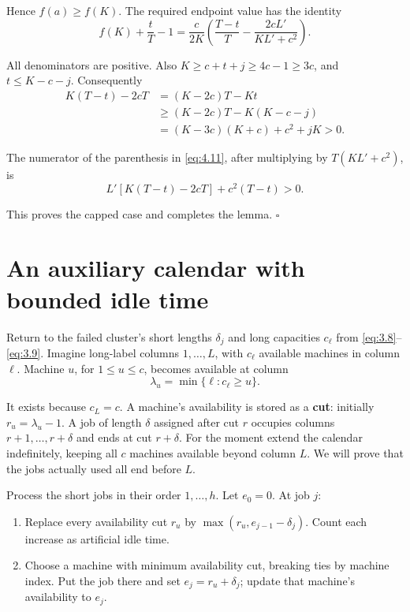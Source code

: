 \documentclass[11pt,a4paper]{article}
\providecommand{\tightlist}{\setlength{\itemsep}{0pt}\setlength{\parskip}{0pt}}
\begin{document}
Hence \(f(a)\ge f(K)\). The required endpoint value has the identity
\begin{equation}
f(K)+\frac tT-1
=\frac{c}{2K}
 \left(\frac{T-t}{T}-\frac{2cL'}{KL'+c^2}\right).
\tag{4.11}
\label{eq:4.11}
\end{equation}

All denominators are positive. Also \(K\ge c+t+j\ge4c-1\ge3c\), and \(t\le K-c-j\). Consequently
\begin{equation}
\begin{aligned}
K(T-t)-2cT
&=(K-2c)T-Kt\\
&\ge(K-2c)T-K(K-c-j)\\
&=(K-3c)(K+c)+c^2+jK>0.
\end{aligned}
\tag{4.12}
\label{eq:4.12}
\end{equation}

The numerator of the parenthesis in \eqref{eq:4.11}, after multiplying by \(T(KL'+c^2)\), is
\[
L'[K(T-t)-2cT]+c^2(T-t)>0.
\]

This proves the capped case and completes the lemma. \(\square\)

\hypertarget{an-auxiliary-calendar-with-bounded-idle-time}{%
\section{An auxiliary calendar with bounded idle time}\label{an-auxiliary-calendar-with-bounded-idle-time}}

Return to the failed cluster's short lengths \(\delta_j\) and long capacities \(c_\ell\) from \eqref{eq:3.8}--\eqref{eq:3.9}. Imagine long-label columns \(1,\ldots,L\), with \(c_\ell\) available machines in column \(\ell\). Machine \(u\), for \(1\le u\le c\), becomes available at column
\[
\lambda_u=\min\{\ell:c_\ell\ge u\}.
\]

It exists because \(c_L=c\). A machine's availability is stored as a \textbf{cut}: initially \(r_u=\lambda_u-1\). A job of length \(\delta\) assigned after cut \(r\) occupies columns \(r+1,\ldots,r+\delta\) and ends at cut \(r+\delta\). For the moment extend the calendar indefinitely, keeping all \(c\) machines available beyond column \(L\). We will prove that the jobs actually used all end before \(L\).

Process the short jobs in their order \(1,\ldots,h\). Let \(e_0=0\). At job \(j\):

\begin{enumerate}
\def\labelenumi{\arabic{enumi}.}
\tightlist
\item
  Replace every availability cut \(r_u\) by \(\max(r_u,e_{j-1}-\delta_j)\). Count each increase as artificial idle time.
\item
  Choose a machine with minimum availability cut, breaking ties by machine index. Put the job there and set \(e_j=r_u+\delta_j\); update that machine's availability to \(e_j\).
\end{enumerate}
\end{document}
